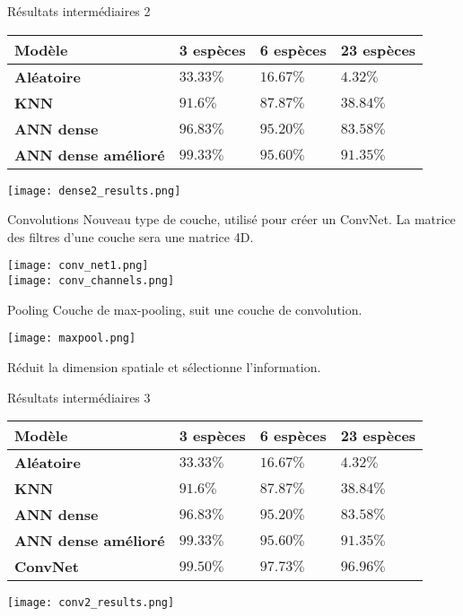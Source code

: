 \documentclass{falconbeamer}
\begin{document}
\begin{frame}{Résultats intermédiaires 2}
	\begin{tabular}{ |m{10em}|m{5.5em}|m{5.5em}|m{5.5em}| }
		\hline
		Modèle & \textbf{3 espèces} & \textbf{6 espèces} &  \textbf{23 espèces} \\
		\hline
		\textbf{Aléatoire} & $33.33\%$ & $16.67\%$ & $4.32\%$ \\
		\textbf{KNN} & $91.6\%$ & $87.87\%$ & $38.84\%$ \\
		\textbf{ANN dense} & $96.83\%$ & $95.20\%$ & $83.58\%$ \\
		\textbf{ANN dense amélioré} & $99.33\%$ & $95.60\%$ & $91.35\%$ \\
		\hline
	\end{tabular}
	\begin{center}
		\texttt{[image: dense2\_results.png]}
	\end{center}
	
\end{frame}

\begin{frame}{Convolutions}
	Nouveau type de couche, utilisé pour créer un ConvNet. La matrice des filtres d'une couche sera une matrice 4D.
	\begin{center}
		\texttt{[image: conv\_net1.png]}\\
		\texttt{[image: conv\_channels.png]}
	\end{center}
\end{frame}

\begin{frame}{Pooling}
	Couche de max-pooling, suit une couche de convolution.
	\begin{center}
		\texttt{[image: maxpool.png]}
	\end{center}
	Réduit la dimension spatiale et sélectionne l'information.
\end{frame}



\begin{frame}{Résultats intermédiaires 3}
	\begin{tabular}{ |m{10em}|m{5.5em}|m{5.5em}|m{5.5em}| }
		\hline
		Modèle & \textbf{3 espèces} & \textbf{6 espèces} &  \textbf{23 espèces} \\
		\hline
		\textbf{Aléatoire} & $33.33\%$ & $16.67\%$ & $4.32\%$ \\
		\textbf{KNN} & $91.6\%$ & $87.87\%$ & $38.84\%$ \\
		\textbf{ANN dense} & $96.83\%$ & $95.20\%$ & $83.58\%$ \\
		\textbf{ANN dense amélioré} & $99.33\%$ & $95.60\%$ & $91.35\%$ \\
		\textbf{ConvNet} & $99.50\%$ & $97.73\%$ & $96.96\%$ \\
		\hline
	\end{tabular}
	\begin{center}
		\texttt{[image: conv2\_results.png]}
	\end{center}
	
\end{frame}
\end{document}
